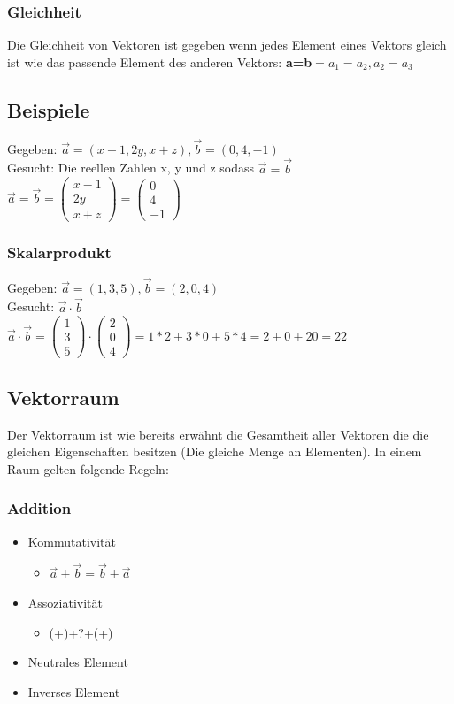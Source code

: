 \documentclass{article}
\begin{document}
	\subsubsection{Gleichheit}
	Die Gleichheit von Vektoren ist gegeben wenn jedes Element eines Vektors gleich ist wie das passende Element des anderen Vektors: \textbf{a=b}$=a_1=a_2, a_2=a_3$
	\subsection{Beispiele}
	Gegeben: $\vec{a}=(x-1,2y,x+z), \vec{b}=(0,4,-1)$ \\
	Gesucht: Die reellen Zahlen x, y und z sodass $\vec{a}=\vec{b}$ \\
	$\vec{a}=\vec{b}=\begin{pmatrix} x-1 \\ 2y  \\ x+z \end{pmatrix}=\begin{pmatrix} 0 \\ 4 \\ -1  \end{pmatrix}$
	\subsubsection{Skalarprodukt}
	Gegeben: $\vec{a}=(1,3,5), \vec{b}=(2,0,4)$ \\
	Gesucht: $\vec{a}\cdot\vec{b}$ \\
	$\vec{a}\cdot\vec{b}=\begin{pmatrix} 1 \\ 3 \\ 5 \end{pmatrix}\cdot \begin{pmatrix} 2 \\ 0 \\ 4 \end{pmatrix}=1*2+3*0+5*4=2+0+20=22$
	\subsection{Vektorraum}
	Der Vektorraum ist wie bereits erwähnt die Gesamtheit aller Vektoren die die gleichen Eigenschaften besitzen (Die gleiche Menge an Elementen). In einem Raum gelten folgende Regeln:
	\subsubsection{Addition}
	\begin{itemize}
		\item{Kommutativität}
		\begin{itemize}
			\item{$\vec{a}+\vec{b}=\vec{b}+\vec{a}$}
		\end{itemize}
		\item{Assoziativität}
		\begin{itemize}
			\item{(+)+?+(+)}
		\end{itemize}
		\item{Neutrales Element}
		\item{Inverses Element}
	\end{itemize}
\end{document}
